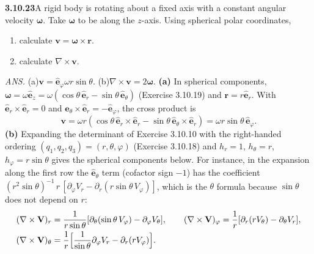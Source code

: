 
\par\bigskip
\noindent\textbf{3.10.23}\quad A rigid body is rotating about a fixed axis
with a constant angular velocity $\boldsymbol{\omega}$. Take
$\boldsymbol{\omega}$ to be along the $z$-axis. Using spherical polar
coordinates,
\begin{enumerate}
\item[(a)] calculate $\mathbf{v}=\boldsymbol{\omega}\times\mathbf{r}$.
\item[(b)] calculate $\nabla\times\mathbf{v}$.
\end{enumerate}
\par\nobreak\hfill\emph{ANS.}\enspace
(a)\enspace$\mathbf{v}=\hat{\mathbf{e}}_{\varphi}\omega r\sin\theta$.\quad
(b)\enspace$\nabla\times\mathbf{v}=2\boldsymbol{\omega}$.
\solution
\textbf{(a)} In spherical components,
$\boldsymbol\omega=\omega\hat{\mathbf e}_z=\omega(\cos\theta\,\hat{\mathbf e}_r-
\sin\theta\,\hat{\mathbf e}_\theta)$ (Exercise 3.10.19) and
$\mathbf r=r\hat{\mathbf e}_r$.
With $\hat{\mathbf e}_r\times\hat{\mathbf e}_r=0$ and
$\hat{\mathbf e}_\theta\times\hat{\mathbf e}_r=-\hat{\mathbf e}_\varphi$,
the cross product is
\[
\mathbf v=\omega r(\cos\theta\,\hat{\mathbf e}_r\times\hat{\mathbf e}_r
-\sin\theta\,\hat{\mathbf e}_\theta\times\hat{\mathbf e}_r)
=\boxed{\omega r\sin\theta\,\hat{\mathbf e}_\varphi}.
\]
\textbf{(b)} Expanding the determinant of Exercise 3.10.10 with the
right-handed ordering $(q_1,q_2,q_3)=(r,\theta,\varphi)$
(Exercise 3.10.18) and $h_r=1$, $h_\theta=r$, $h_\varphi=r\sin\theta$
gives the spherical components below. For instance, in the expansion
along the first row the $\hat{\mathbf e}_\theta$ term (cofactor sign $-1$)
has the coefficient
$(r^2\sin\theta)^{-1}\,r\,[\partial_\varphi V_r-\partial_r(r\sin\theta\,V_\varphi)]$,
which is the $\theta$ formula because $\sin\theta$ does not depend on $r$:
\[
\begin{aligned}
(\nabla\times\mathbf V)_r&=\frac1{r\sin\theta}
[\partial_\theta(\sin\theta\,V_\varphi)-\partial_\varphi V_\theta],\qquad
(\nabla\times\mathbf V)_\varphi=\frac1r[\partial_r(rV_\theta)-\partial_\theta V_r],\\
(\nabla\times\mathbf V)_\theta&=\frac1r\Bigl[\frac1{\sin\theta}\partial_\varphi V_r
-\partial_r(rV_\varphi)\Bigr].
\end{aligned}
\]
